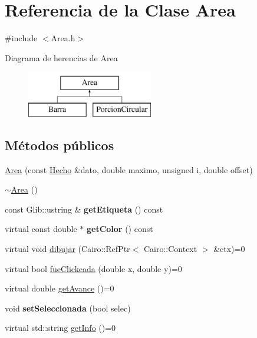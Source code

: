 \hypertarget{classArea}{\section{\-Referencia de la \-Clase \-Area}
\label{classArea}
}


{\ttfamily \#include $<$\-Area.\-h$>$}

\-Diagrama de herencias de \-Area\begin{figure}[H]
\begin{center}
\leavevmode
\includegraphics[height=2.000000cm]{classArea}
\end{center}
\end{figure}
\subsection*{\-Métodos públicos}
\begin{DoxyCompactItemize}
\item 
\hyperlink{classArea_a5731b69e91544f031d0b3704397d6fc7}{\-Area} (const \hyperlink{classHecho}{\-Hecho} \&dato, double maximo, unsigned i, double offset)
\item 
\hyperlink{classArea_ace0975982b61a16746c564a0d43a4cc8}{$\sim$\-Area} ()
\item 
\hypertarget{classArea_a90c09de98eae75693b9c79343ca297ca}{const \-Glib\-::ustring \& {\bfseries get\-Etiqueta} () const }\label{classArea_a90c09de98eae75693b9c79343ca297ca}

\item 
\hypertarget{classArea_a2db89df7aded80c028a412221b237491}{virtual const double $\ast$ {\bfseries get\-Color} () const }\label{classArea_a2db89df7aded80c028a412221b237491}

\item 
virtual void \hyperlink{classArea_a95274f96ffa5525307f0a00d074047fb}{dibujar} (\-Cairo\-::\-Ref\-Ptr$<$ \-Cairo\-::\-Context $>$ \&ctx)=0
\item 
virtual bool \hyperlink{classArea_a4158f8c72ff8c67b5d1de00aa9691e90}{fue\-Clickeada} (double x, double y)=0
\item 
virtual double \hyperlink{classArea_ac8a3293cc9ba5678997e9cb0b4a142f9}{get\-Avance} ()=0
\item 
\hypertarget{classArea_a5955ad0781f9cf9bee7e845a7d1dffee}{void {\bfseries set\-Seleccionada} (bool selec)}\label{classArea_a5955ad0781f9cf9bee7e845a7d1dffee}

\item 
virtual std\-::string \hyperlink{classArea_a1934f44c890ca764b7e47dba984a32d5}{get\-Info} ()=0
\end{DoxyCompactItemize}
